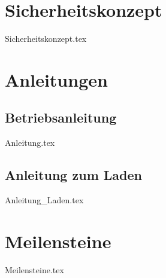 \documentclass[paper=a4,12pt]{scrreprt}
\begin{document}
\chapter{Sicherheitskonzept}
{Sicherheitskonzept.tex}

\chapter{Anleitungen}
\section{Betriebsanleitung}
{Anleitung.tex}

\section{Anleitung zum Laden \label{sec:Anleitung_Laden}}
{Anleitung_Laden.tex}

\chapter{Meilensteine}
{Meilensteine.tex}

\clearpage
\appendix
\def\chapterpagestyle{empty} 




\setcounter{lofdepth}{2}
\dipalistoffigures

\setcounter{lotdepth}{2}
\dipalistoftables

\newpage

 
 
\end{document}

